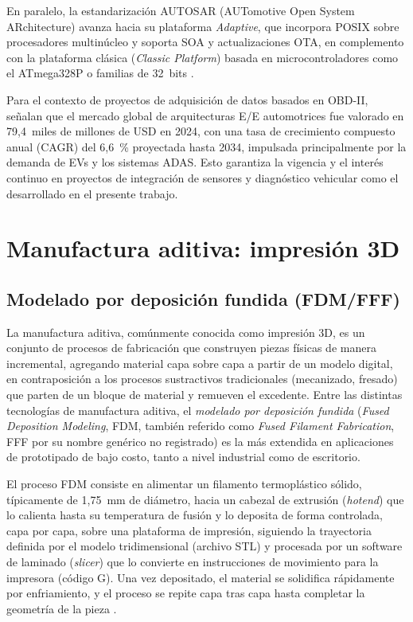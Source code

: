 En paralelo, la estandarización AUTOSAR (AUTomotive Open
System ARchitecture) avanza hacia su plataforma
\textit{Adaptive}, que incorpora POSIX sobre procesadores
multinúcleo y soporta SOA y actualizaciones OTA, en
complemento con la plataforma clásica (\textit{Classic
	Platform}) basada en microcontroladores como el ATmega328P o
familias de 32~bits \citep{Embien_EE2024, Springer_EEArch2024}.

Para el contexto de proyectos de adquisición de datos basados
en OBD-II, \citet{GMInsights2025} señalan que el mercado
global de arquitecturas E/E automotrices fue valorado en
79{,}4~miles de millones de USD en 2024, con una tasa de
crecimiento compuesto anual (CAGR) del 6{,}6~\% proyectada
hasta 2034, impulsada principalmente por la demanda de EVs y
los sistemas ADAS.  Esto garantiza la vigencia y el interés
continuo en proyectos de integración de sensores y
diagnóstico vehicular como el desarrollado en el presente
trabajo.

\section{Manufactura aditiva: impresión 3D}
\label{sec:manufactura_aditiva}

\subsection{Modelado por deposición fundida (FDM/FFF)}

La manufactura aditiva, comúnmente conocida como impresión 3D, es un conjunto de procesos de fabricación que construyen piezas físicas de manera incremental, agregando material capa sobre capa a partir de un modelo digital, en contraposición a los procesos sustractivos tradicionales (mecanizado, fresado) que parten de un bloque de material y remueven el excedente. Entre las distintas tecnologías de manufactura aditiva, el \textit{modelado por deposición fundida} (\textit{Fused Deposition Modeling}, FDM, también referido como \textit{Fused Filament Fabrication}, FFF por su nombre genérico no registrado) es la más extendida en aplicaciones de prototipado de bajo costo, tanto a nivel industrial como de escritorio.

El proceso FDM consiste en alimentar un filamento termoplástico sólido, típicamente de 1,75~mm de diámetro, hacia un cabezal de extrusión (\textit{hotend}) que lo calienta hasta su temperatura de fusión y lo deposita de forma controlada, capa por capa, sobre una plataforma de impresión, siguiendo la trayectoria definida por el modelo tridimensional (archivo STL) y procesada por un software de laminado (\textit{slicer}) que lo convierte en instrucciones de movimiento para la impresora (código G). Una vez depositado, el material se solidifica rápidamente por enfriamiento, y el proceso se repite capa tras capa hasta completar la geometría de la pieza \citep{Wevolver_PLAABSPETG2023}.

